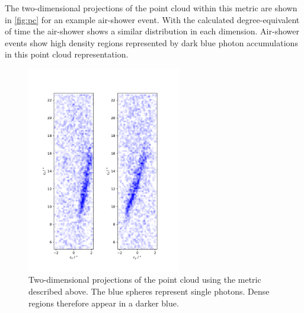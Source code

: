The two-dimensional projections of the point cloud within this metric are shown
in \autoref{fig:pc} for an example air-shower event. With the calculated
degree-equivalent of time the air-shower shows a similar distribution in
each dimension. Air-shower events show high density regions represented by
dark blue photon accumulations in this point cloud representation.
%
\begin{figure}[H]
  \centering
  \includegraphics[width=0.6\textwidth, angle=-90]{Plots/point_cloud.pdf}
  \caption{Two-dimensional projections of the point cloud using the metric described above. The blue spheres represent single photons. Dense regions therefore appear in a darker blue.}
  \label{fig:pc}
\end{figure}
%

